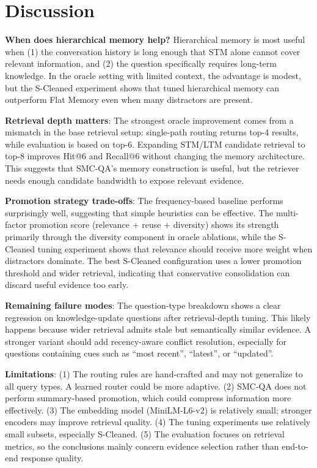 \documentclass{article}
\begin{document}
\section{Discussion}

\textbf{When does hierarchical memory help?} Hierarchical memory is most useful when (1) the conversation history is long enough that STM alone cannot cover relevant information, and (2) the question specifically requires long-term knowledge. In the oracle setting with limited context, the advantage is modest, but the S-Cleaned experiment shows that tuned hierarchical memory can outperform Flat Memory even when many distractors are present.

\textbf{Retrieval depth matters}: The strongest oracle improvement comes from a mismatch in the base retrieval setup: single-path routing returns top-4 results, while evaluation is based on top-6. Expanding STM/LTM candidate retrieval to top-8 improves Hit@6 and Recall@6 without changing the memory architecture. This suggests that SMC-QA's memory construction is useful, but the retriever needs enough candidate bandwidth to expose relevant evidence.

\textbf{Promotion strategy trade-offs}: The frequency-based baseline performs surprisingly well, suggesting that simple heuristics can be effective. The multi-factor promotion score (relevance + reuse + diversity) shows its strength primarily through the diversity component in oracle ablations, while the S-Cleaned tuning experiment shows that relevance should receive more weight when distractors dominate. The best S-Cleaned configuration uses a lower promotion threshold and wider retrieval, indicating that conservative consolidation can discard useful evidence too early.

\textbf{Remaining failure modes}: The question-type breakdown shows a clear regression on knowledge-update questions after retrieval-depth tuning. This likely happens because wider retrieval admits stale but semantically similar evidence. A stronger variant should add recency-aware conflict resolution, especially for questions containing cues such as ``most recent'', ``latest'', or ``updated''.

\textbf{Limitations}: (1) The routing rules are hand-crafted and may not generalize to all query types. A learned router could be more adaptive. (2) SMC-QA does not perform summary-based promotion, which could compress information more effectively. (3) The embedding model (MiniLM-L6-v2) is relatively small; stronger encoders may improve retrieval quality. (4) The tuning experiments use relatively small subsets, especially S-Cleaned. (5) The evaluation focuses on retrieval metrics, so the conclusions mainly concern evidence selection rather than end-to-end response quality.
\end{document}
